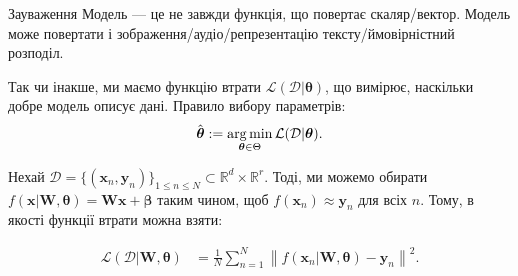 \documentclass{zkdl-presentation-template}
\begin{document}
    \begin{frame}
        \begin{block}{Зауваження}
            Модель --- це не завжди функція, що повертає скаляр/вектор. Модель
            може повертати і зображення/аудіо/репрезентацію тексту/ймовірністний
            розподіл.\pause
        \end{block}

        Так чи інакше, ми маємо функцію втрати $\mathcal{L}(\mathcal{D}|\boldsymbol{\theta})$, що вимірює, наскільки добре модель описує дані. Правило вибору параметрів:
        \begin{equation*}
            \hat{\boldsymbol{\theta}} := \operatorname*{arg\,min}_{\boldsymbol{\theta} \in \Theta} \mathcal{L}(\mathcal{D}|\boldsymbol{\theta}).
        \end{equation*}
        \vspace{-15px}
        \pause\begin{example}
            Нехай $\mathcal{D} = \{(\boldsymbol{x}_n,\boldsymbol{y}_n)\}_{1 \leq
            n \leq N} \subset \mathbb{R}^d \times \mathbb{R}^r$. Тоді, ми можемо
            обирати
            $f(\boldsymbol{x}|\boldsymbol{W},\boldsymbol{\theta})=\boldsymbol{W}\boldsymbol{x}+\boldsymbol{\beta}$ таким чином,
            щоб $f(\boldsymbol{x}_n) \approx \boldsymbol{y}_n$ для всіх $n$. Тому, в якості функції втрати можна взяти:\pause
            
            \vspace{-20px}
            \begin{align*}
                \mathcal{L}(\mathcal{D}|\boldsymbol{W},\boldsymbol{\theta}) &= \frac{1}{N}\sum_{n=1}^N\left\|f(\boldsymbol{x}_n|\boldsymbol{W},\boldsymbol{\theta}) - \boldsymbol{y}_n \right\|^2.
            \end{align*}
        \end{example}
    \end{frame}
\end{document}
